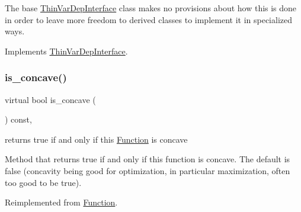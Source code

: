 The base \mbox{\hyperlink{class_s_m_spp__di__unipi__it_1_1_thin_var_dep_interface}{Thin\+Var\+Dep\+Interface}} class makes no provisions about how this is done in order to leave more freedom to derived classes to implement it in specialized ways. 

Implements \mbox{\hyperlink{group___thin_var_dep_interface___c_l_a_s_s_e_s_ga05297a4e506f89ec692a01aca971ce2d}{Thin\+Var\+Dep\+Interface}}.

\mbox{\label{class_s_m_spp__di__unipi__it_1_1_d_quad_function_abdb6d9788add66498dda476d9f5f1ff7}} 
\subsubsection{\texorpdfstring{is\+\_\+concave()}{is\_concave()}}
{\footnotesize\ttfamily virtual bool is\+\_\+concave (\begin{DoxyParamCaption}\item[{void}]{ }\end{DoxyParamCaption}) const\hspace{0.3cm}{\ttfamily [override]}, {\ttfamily [virtual]}}



returns true if and only if this \mbox{\hyperlink{class_s_m_spp__di__unipi__it_1_1_function}{Function}} is concave 

Method that returns true if and only if this function is concave. The default is false (concavity being good for optimization, in particular maximization, often too good to be true). 

Reimplemented from \mbox{\hyperlink{class_s_m_spp__di__unipi__it_1_1_function_a123711e22aabb119629862cf3cb791de}{Function}}.

\mbox{\label{class_s_m_spp__di__unipi__it_1_1_d_quad_function_ae8dc9a7225895704afe3802754f4fd75}} 
